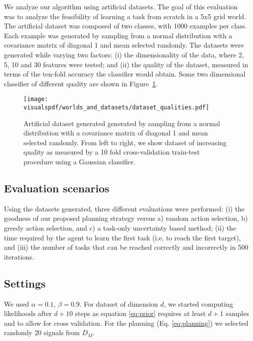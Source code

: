 We analyze our algorithm using artificial datasets. The goal of this evaluation was to analyze the feasibility of learning a task from scratch in a 5x5 grid world. The artificial dataset was composed of two classes, with 1000 examples per class. Each example was generated by sampling from a normal distribution with a covariance matrix of diagonal 1 and mean selected randomly. The datasets were generated while varying two factors: (i) the dimensionality of the data, where 2, 5, 10 and 30 features were tested; and (ii) the quality of the dataset, measured in terms of the ten-fold accuracy the classifier would obtain. Some two dimensional classifier of different quality are shown in Figure~\ref{fig:datasetsquality}.

\begin{figure}[!ht]
  \centering
      \texttt{[image: \\visualspdf/worlds\_and\_datasets/dataset\_qualities.pdf]}
      \caption{Artificial dataset generated generated by sampling from a normal distribution with a covariance matrix of diagonal 1 and mean selected randomly. From left to right, we show dataset of increasing quality as measured by a 10 fold cross-validation train-test procedure using a Gaussian classifier.}
    \label{fig:datasetsquality}
\end{figure}


\subsection{Evaluation scenarios}

Using the datasets generated, three different evaluations were performed: (i) the goodness of our proposed planning strategy versus a) random action selection, b) greedy action selection, and c) a task-only uncertainty based method; (ii) the time required by the agent to learn the first task (i.e. to reach the first target), and (iii) the number of tasks that can be reached correctly and incorrectly in 500 iterations.

\subsection{Settings}

We used $\alpha = 0.1$, $\beta = 0.9$. For dataset of dimension $d$, we started computing likelihoods after $d+10$ steps as equation \ref{eq:prior} requires at least $d+1$ samples and to allow for cross validation. For the planning (Eq. \ref{eq:planning}) we selected randomly $20$ signals from $D_M$.


